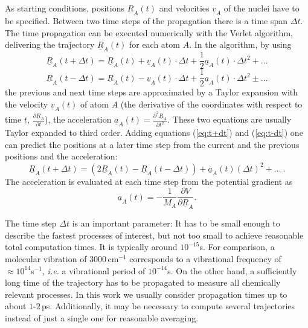 \documentclass[11pt,DIV=13,BCOR=5mm,a4paper,headinclude]{scrbook}
\renewcommand{\vec}[1]{\underline{#1}}
\begin{document}
As starting conditions, positions $\vec{R}_A(t)$ and velocities $\vec{v}_A$ of the nuclei have to be specified.
Between two time steps of the propagation there is a time span $\Delta t$.
The time propagation can be executed numerically with the Verlet algorithm\cite{verlet}, delivering the trajectory $\vec{R}_A(t)$ for each atom $A$.
In the algorithm, by using
\begin{equation}\label{eq:t+dt}
 \vec{R}_A(t+\Delta t) = \vec{R}_A(t) + \vec{v}_A(t)\cdot \Delta t + \frac{1}{2}\vec{a}_A(t)\cdot \Delta t^2 + ...
 \end{equation}
 \begin{equation}\label{eq:t-dt}
 \vec{R}_A(t-\Delta t) = \vec{R}_A(t) - \vec{v}_A(t)\cdot \Delta t + \frac{1}{2}\vec{a}_A(t)\cdot \Delta t^2 \pm ...
\end{equation}
the previous and next time steps are approximated by a Taylor expansion with the velocity $\vec{v}_A(t)$ of atom $A$ (the derivative of the coordinates with respect to time $t$, $\frac{\partial \vec{R}_A}{\partial t}$), the acceleration $\vec{a}_A(t)=\frac{\partial^2 \vec{R}_A}{\partial t^2}$.
These two equations are usually Taylor expanded to third order.
Adding equations (\ref{eq:t+dt}) and (\ref{eq:t-dt}) one can predict the positions at a later time step from the current and the previous positions and the acceleration:
\begin{equation}
 \vec{R}_A(t+\Delta t)=(2\vec{R}_A(t) - \vec{R}_A(t-\Delta t)) + \vec{a}_A(t)(\Delta t)^2 + \ldots ~.
\end{equation}
The acceleration is evaluated at each time step from the potential gradient as
\begin{equation}
 \vec{a}_A(t)=-\frac{1}{M_A}\frac{\partial V}{\partial\vec{R}_A}.
\end{equation}


The time step $\Delta t$ is an important parameter: It has to be small enough to describe the fastest processes of interest, but not too small to achieve reasonable total computation times.
It is typically around $10^{-15}$s.
For comparison, a molecular vibration of $3000\,$cm$^{-1}$ corresponds to a vibrational frequency of $\approx 10^{14}$s$^{-1}$, \textit{i.e.} a vibrational period of $10^{-14}$s.
On the other hand, a sufficiently long time of the trajectory has to be propagated to measure all chemically relevant processes.
In this work we usually consider propagation times up to about $1$-$2\,$ps.
Additionally, it may be necessary to compute several trajectories instead of just a single one for reasonable averaging.
\end{document}
